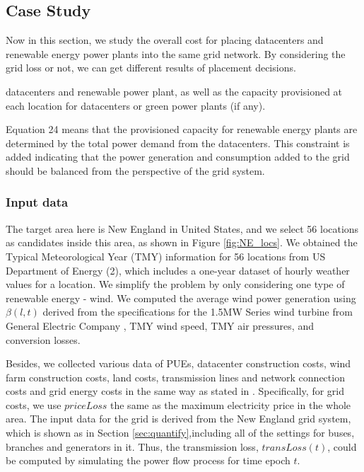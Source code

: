 \subsection{Case Study}
\label{sec:eval}

Now in this section, we study the overall cost for placing datacenters and renewable energy power plants into the same grid network. By considering the grid loss or not, we can get different results of placement decisions.


datacenters and renewable power plant, as well as the capacity provisioned at each location for datacenters or green power plants (if any).

Equation 24 means that the provisioned capacity for renewable energy plants are determined by the total power demand from the datacenters. This constraint is added indicating that the power generation and consumption added to the grid should be balanced from the perspective of the grid system.


\subsubsection{Input data}

The target area here is New England in United States, and we select 56 locations as candidates inside this area, as shown in Figure \ref{fig:NE_locs}. We obtained the Typical Meteorological Year (TMY) information for 56 locations from US Department of Energy (2), which includes a one-year dataset of hourly weather values for a location. We simplify the problem by only considering one type of renewable energy - wind. We computed the average wind power generation using $\beta(l,t)$ derived from the specifications for the 1.5MW Series wind turbine from General Electric Company \cite{GE15MW}, TMY wind speed, TMY air pressures, and conversion losses.

Besides, we collected various data of PUEs, datacenter construction costs, wind farm construction costs, land costs, transmission lines and network connection costs and grid energy costs in the same way as stated in \cite{berral2014building}. Specifically, for grid costs, we use $priceLoss$ the same as the maximum electricity price in the whole area. The input data for the grid is derived from the New England grid system, which is shown as in Section \ref{sec:quantify},including all of the settings for buses, branches and generators in it. Thus, the transmission loss, $transLoss(t)$, could be computed by simulating the power flow process for time epoch $t$.  %


